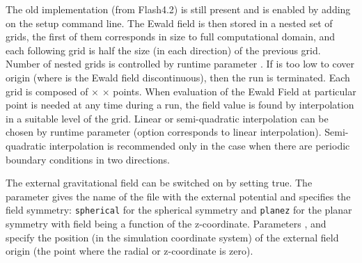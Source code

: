 The old implementation (from Flash4.2) is still present and is enabled
by adding
 on the setup command line.
The Ewald field is then stored
in a nested set of grids, the first of them corresponds in size to full
computational domain, and each following grid is half the size (in each
direction) of the previous grid. Number of nested grids is controlled by
runtime parameter . If  is too low to
cover origin (where is the Ewald field discontinuous), then the run is terminated.
Each grid is composed of  $\times$
 $\times$   points.
When evaluation of the Ewald Field at particular point is
needed at any time during a run, the field value is found by interpolation in a suitable level of the grid. Linear or
semi-quadratic interpolation can be chosen by runtime parameter
 (option  corresponds to linear
interpolation). Semi-quadratic interpolation is recommended only in the case
when there are periodic boundary conditions in two directions.

The external gravitational field can be switched on by setting
 true. The parameter 
gives the name of the file with the external potential and
 specifies the field symmetry: \texttt{spherical} for
the spherical symmetry and \texttt{planez} for the planar symmetry with field
being a function of the z-coordinate. Parameters ,
 and  specify the
position (in the simulation coordinate system) of the external field origin (the
point where the radial or z-coordinate is zero).


